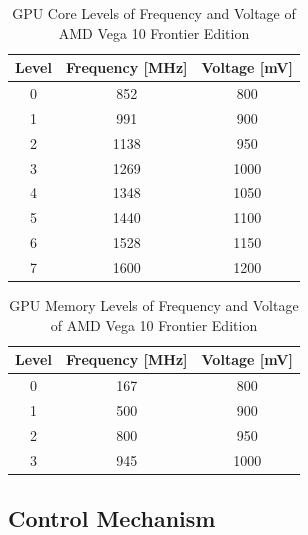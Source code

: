 \begin{table}[!htb]
\renewcommand{\arraystretch}{1.2} %
\centering
\begin{tabular}{ccc}
\textbf{Level} & \textbf{Frequency {[}MHz{]}} & \textbf{Voltage {[}mV{]}} \\ \hline
0              & 852                          & 800                       \\
1              & 991                          & 900                       \\
2              & 1138                         & 950                       \\
3              & 1269                         & 1000                      \\
4              & 1348                         & 1050                      \\
5              & 1440                         & 1100                      \\
6              & 1528                         & 1150                      \\
7              & 1600                         & 1200                      \\ \hline
\end{tabular}
\caption{GPU Core Levels of Frequency and Voltage of AMD Vega 10 Frontier Edition}
\label{tab:gpucorelevels}
\end{table}

\begin{table}[!htb]
\renewcommand{\arraystretch}{1.2} %
\centering
\begin{tabular}{ccc}
\textbf{Level} & \textbf{Frequency {[}MHz{]}} & \textbf{Voltage {[}mV{]}} \\ \hline
0              & 167                          & 800                       \\
1              & 500                          & 900                       \\
2              & 800                          & 950                       \\
3              & 945                          & 1000                      \\ \hline
\end{tabular}
\caption{GPU Memory Levels of Frequency and Voltage of AMD Vega 10 Frontier Edition}
\label{tab:gpumemlevels}
\end{table}

\subsection{Control Mechanism}

